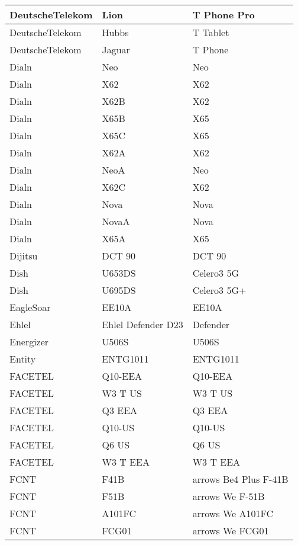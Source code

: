 \begin{tabularx}{\linewidth}{|l|X|X|}
        DeutscheTelekom & Lion & T Phone Pro \\ \hline
        DeutscheTelekom & Hubbs & T Tablet \\ \hline
        DeutscheTelekom & Jaguar & T Phone \\ \hline
        Dialn & Neo & Neo \\ \hline
        Dialn & X62 & X62 \\ \hline
        Dialn & X62B & X62 \\ \hline
        Dialn & X65B & X65 \\ \hline
        Dialn & X65C & X65 \\ \hline
        Dialn & X62A & X62 \\ \hline
        Dialn & NeoA & Neo \\ \hline
        Dialn & X62C & X62 \\ \hline
        Dialn & Nova & Nova \\ \hline
        Dialn & NovaA & Nova \\ \hline
        Dialn & X65A & X65 \\ \hline
        Dijitsu & DCT 90 & DCT 90 \\ \hline
        Dish & U653DS & Celero3 5G \\ \hline
        Dish & U695DS & Celero3 5G+ \\ \hline
        EagleSoar & EE10A & EE10A \\ \hline
        Ehlel & Ehlel Defender D23 & Defender \\ \hline
        Energizer & U506S & U506S \\ \hline
        Entity & ENTG1011 & ENTG1011 \\ \hline
        FACETEL & Q10-EEA & Q10-EEA \\ \hline
        FACETEL & W3 T US & W3 T US \\ \hline
        FACETEL & Q3 EEA & Q3 EEA \\ \hline
        FACETEL & Q10-US & Q10-US \\ \hline
        FACETEL & Q6 US & Q6 US \\ \hline
        FACETEL & W3 T EEA & W3 T EEA \\ \hline
        FCNT & F41B & arrows Be4 Plus F-41B \\ \hline
        FCNT & F51B & arrows We F-51B \\ \hline
        FCNT & A101FC & arrows We A101FC \\ \hline
        FCNT & FCG01 & arrows We FCG01 \\ \hline

\end{tabularx}
